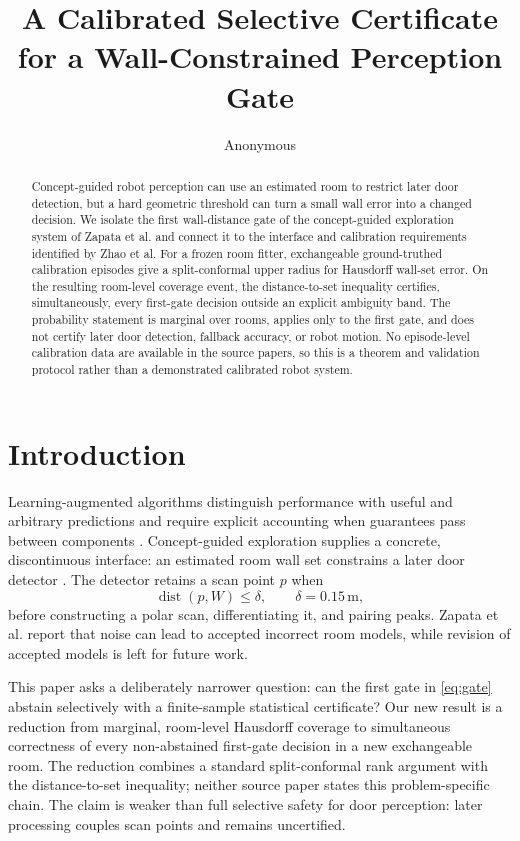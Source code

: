 \documentclass{article}
\title{A Calibrated Selective Certificate for a Wall-Constrained Perception Gate}
\author{Anonymous}
\date{}
\begin{document}
\maketitle

\begin{abstract}
Concept-guided robot perception can use an estimated room to restrict later door detection, but a hard geometric threshold can turn a small wall error into a changed decision. We isolate the first wall-distance gate of the concept-guided exploration system of Zapata et al. and connect it to the interface and calibration requirements identified by Zhao et al. %
For a frozen room fitter, exchangeable ground-truthed calibration episodes give a split-conformal upper radius for Hausdorff wall-set error. %
On the resulting room-level coverage event, the distance-to-set inequality certifies, simultaneously, every first-gate decision outside an explicit ambiguity band. %
The probability statement is marginal over rooms, applies only to the first gate, and does not certify later door detection, fallback accuracy, or robot motion. %
No episode-level calibration data are available in the source papers, so this is a theorem and validation protocol rather than a demonstrated calibrated robot system. %
\end{abstract}

\section{Introduction}

Learning-augmented algorithms distinguish performance with useful and arbitrary predictions and require explicit accounting when guarantees pass between components \cite{zhao2026laa}. %
Concept-guided exploration supplies a concrete, discontinuous interface: an estimated room wall set constrains a later door detector \cite{zapata2026concept}. %
The detector retains a scan point $p$ when
\begin{equation}
  \operatorname{dist}(p,W)\leq\delta, \qquad \delta=0.15\,\mathrm{m},
  \label{eq:gate}
\end{equation}
before constructing a polar scan, differentiating it, and pairing peaks. %
Zapata et al. report that noise can lead to accepted incorrect room models, while revision of accepted models is left for future work. %

This paper asks a deliberately narrower question: can the first gate in \eqref{eq:gate} abstain selectively with a finite-sample statistical certificate? %
Our new result is a reduction from marginal, room-level Hausdorff coverage to simultaneous correctness of every non-abstained first-gate decision in a new exchangeable room. %
The reduction combines a standard split-conformal rank argument with the distance-to-set inequality; neither source paper states this problem-specific chain. %
The claim is weaker than full selective safety for door perception: later processing couples scan points and remains uncertified. %
\end{document}
